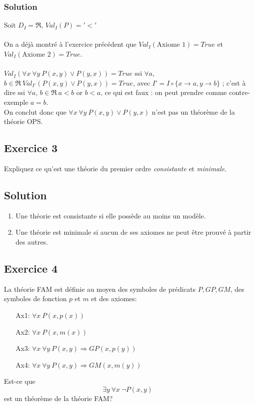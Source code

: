    \subsubsection*{Solution}
    \noindent Soit $D_I = \Re$, $Val_I(P) = '<'$\\
    \\
    On a déjà montré à l'exercice précédent que $Val_I (\text{Axiome 1}) = True$ et $Val_I (\text{Axiome 2}) = True$.\\
    \\
    $Val_I (\forall x \ \forall y \ P(x, y) \lor P(y, x)) = True$ ssi $\forall a$, $b \in \Re \ Val_{I'}(P(x, y) \lor P(y, x)) = True$, avec $I' = I \circ \{x \rightarrow a, y \rightarrow b\}$ ; c'est à dire ssi $\forall a$, $b \in \Re \ a<b$ or $b<a$, ce qui est faux : on peut prendre comme contre-exemple $a = b$.\\
    On conclut donc que $\forall x \ \forall y \ P(x, y) \lor P(y, x)$ n'est pas un théorème de la théorie OPS.


\subsection*{Exercice 3}
Expliquez ce qu'est une th\'{e}orie du premier ordre \textit{consistante} et \textit{minimale}.%

    \subsection*{Solution}
    \begin{enumerate}
    \item Une théorie est consistante si elle possède au moins un modèle.
    \item Une théorie est minimale si aucun de ses axiomes ne peut être prouvé à partir des autres.
    \end{enumerate}

\subsection*{Exercice 4}
La th\'{e}orie FAM est d\'{e}finie au moyen des symboles de pr\'{e}dicats $P, GP, GM$, des symboles de fonction $p$ et $m$ et des axiomes:
\begin{enumerate}
\item[Ax1:] $\forall x \ P(x, p(x))$
\item[Ax2:] $\forall x \ P(x, m(x))$
\item[Ax3:] $\forall x \ \forall y \ P(x, y) \Rightarrow GP(x, p(y))$
\item[Ax4:] $\forall x \ \forall y \ P(x, y) \Rightarrow GM(x, m(y))$
\end{enumerate}
Est-ce que
$$
\exists y \ \forall x \ \neg P(x, y) 
$$
est un th\'{e}or\`{e}me de la th\'{e}orie FAM?


